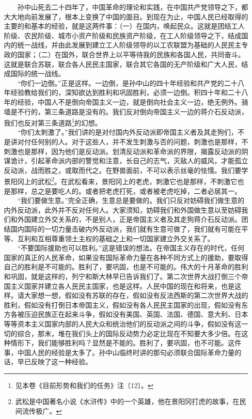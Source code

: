 \documentclass[cn,11pt,chinese]{elegantbook}
\begin{document}
　　孙中山死去二十四年了，中国革命的理论和实践，在中国共产党领导之下，都大大地向前发展了，根本上变换了中国的面目。到现在为止，中国人民已经取得的主要的和基本的经验，就是这两件事：（一）在国内，唤起民众。这就是团结工人阶级、农民阶级、城市小资产阶级和民族资产阶级，在工人阶级领导之下，结成国内的统一战线，并由此发展到建立工人阶级领导的以工农联盟为基础的人民民主专政的国家；（二）在国外，联合世界上以平等待我的民族和各国人民，共同奋斗。这就是联合苏联，联合各人民民主国家，联合其它各国的无产阶级和广大人民，结成国际的统一战线。\\
　　“你们一边倒。”正是这样。一边倒，是孙中山的四十年经验和共产党的二十八年经验教给我们的，深知欲达到胜利和巩固胜利，必须一边倒。积四十年和二十八年的经验，中国人不是倒向帝国主义一边，就是倒向社会主义一边，绝无例外。骑墙是不行的，第三条道路是没有的。我们反对倒向帝国主义一边的蒋介石反动派，我们也反对第三条道路\footnote[9]{ 见本卷《目前形势和我们的任务》注〔12〕。}的幻想。\\
　　“你们太刺激了。”我们讲的是对付国内外反动派即帝国主义者及其走狗们，不是讲对付任何别的人。对于这些人，并不发生刺激与否的问题，刺激也是那样，不刺激也是那样，因为他们是反动派。划清反动派和革命派的界限，揭露反动派的阴谋诡计，引起革命派内部的警觉和注意，长自己的志气，灭敌人的威风，才能孤立反动派，战而胜之，或取而代之。在野兽面前，不可以表示丝毫的怯懦。我们要学景阳冈上的武松\footnote[10]{ 武松是中国著名小说《水浒传》中的一个英雄，他在景阳冈打虎的故事，在民间流传极广。}。在武松看来，景阳冈上的老虎，刺激它也是那样，不刺激它也是那样，总之是要吃人的。或者把老虎打死，或者被老虎吃掉，二者必居其一。\\
　　“我们要做生意。”完全正确，生意总是要做的。我们只反对妨碍我们做生意的内外反动派，此外并不反对任何人。大家须知，妨碍我们和外国做生意以至妨碍我们和外国建立外交关系的，不是别人，正是帝国主义者及其走狗蒋介石反动派。团结国内国际的一切力量击破内外反动派，我们就有生意可做了，我们就有可能在平等、互利和互相尊重领土主权的基础之上和一切国家建立外交关系了。\\
　　“不要国际援助也可以胜利。”这是错误的想法。在帝国主义存在的时代，任何国家的真正的人民革命，如果没有国际革命力量在各种不同方式上的援助，要取得自己的胜利是不可能的。胜利了，要巩固，也是不可能的。伟大的十月革命的胜利和巩固，就是这样的，列宁和斯大林早已告诉我们了。第二次世界大战打倒三个帝国主义国家并建立各人民民主国家，也是这样。人民中国的现在和将来，也是这样。请大家想一想，假如没有苏联的存在，假如没有反法西斯的第二次世界大战的胜利，假如没有打倒日本帝国主义，假如没有各人民民主国家的出现，假如没有东方各被压迫民族正在起来斗争，假如没有美国、英国、法国、德国、意大利、日本等等资本主义国家内部的人民大众和统治他们的反动派之间的斗争，假如没有这一切的综合，那末，堆在我们头上的国际反动势力必定比现在不知要大多少倍。在这种情形下，我们能够胜利吗？显然是不能的。胜利了，要巩固，也不可能。这件事，中国人民的经验是太多了。孙中山临终时讲的那句必须联合国际革命力量的话，早已反映了这一种经验。\\
\end{document}
